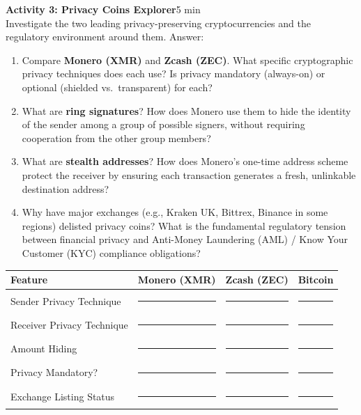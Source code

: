 \documentclass[11pt,a4paper]{article}
\newcommand{\activitybox}[3]{%
  \noindent\colorbox{mllavender4}{\parbox{\dimexpr\linewidth-2\fboxsep}{%
    \textbf{\color{mlpurple}#1}\hfill\textcolor{mlgray}{\small #2}\\[2pt]#3%
  }}\par\vspace{4pt}%
}
\newcommand{\fillcell}{\rule{2.2cm}{0.3pt}}
\begin{document}
\activitybox{Activity 3: Privacy Coins Explorer}{5 min}{%
Investigate the two leading privacy-preserving cryptocurrencies and the regulatory environment around them. Answer:
\begin{enumerate}
\item Compare \textbf{Monero (XMR)} and \textbf{Zcash (ZEC)}. What specific cryptographic privacy techniques does each use? Is privacy mandatory (always-on) or optional (shielded vs.\ transparent) for each?
\item What are \textbf{ring signatures}? How does Monero use them to hide the identity of the sender among a group of possible signers, without requiring cooperation from the other group members?
\item What are \textbf{stealth addresses}? How does Monero's one-time address scheme protect the receiver by ensuring each transaction generates a fresh, unlinkable destination address?
\item Why have major exchanges (e.g., Kraken UK, Bittrex, Binance in some regions) delisted privacy coins? What is the fundamental regulatory tension between financial privacy and Anti-Money Laundering (AML) / Know Your Customer (KYC) compliance obligations?
\end{enumerate}
\vspace{4pt}
{\footnotesize\renewcommand{\arraystretch}{1.35}%
\setlength{\tabcolsep}{5pt}%
\begin{tabular}{@{}p{4.0cm}p{3.5cm}p{3.5cm}p{3.0cm}@{}}
\toprule
\textbf{Feature} & \textbf{Monero (XMR)} & \textbf{Zcash (ZEC)} & \textbf{Bitcoin} \\
\midrule
Sender Privacy Technique  & \fillcell & \fillcell & \fillcell \\
Receiver Privacy Technique & \fillcell & \fillcell & \fillcell \\
Amount Hiding             & \fillcell & \fillcell & \fillcell \\
Privacy Mandatory?        & \fillcell & \fillcell & \fillcell \\
Exchange Listing Status   & \fillcell & \fillcell & \fillcell \\
\bottomrule
\end{tabular}}
\vspace{2pt}
}

\vspace{2pt}
\end{document}
